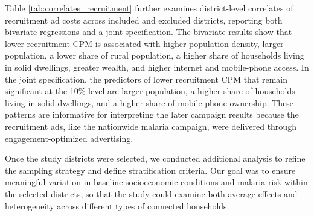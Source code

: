 Table \ref{tab:correlates_recruitment} further examines district-level correlates of recruitment ad costs across included and excluded districts, reporting both bivariate regressions and a joint specification. The bivariate results show that lower recruitment CPM is associated with higher population density, larger population, a lower share of rural population, a higher share of households living in solid dwellings, greater wealth, and higher internet and mobile-phone access. In the joint specification, the predictors of lower recruitment CPM that remain significant at the 10\% level are larger population, a higher share of households living in solid dwellings, and a higher share of mobile-phone ownership. These patterns are informative for interpreting the later campaign results because the recruitment ads, like the nationwide malaria campaign, were delivered through engagement-optimized advertising.

\begin{table}[!htbp]
    \centering
    \caption{District-level correlates of recruitment advertising costs}
    \footnotesize
    \hspace*{-1.5cm}
    
    \label{tab:correlates_recruitment}
\end{table}

Once the study districts were selected, we conducted additional analysis to refine the sampling strategy and define stratification criteria. Our goal was to ensure meaningful variation in baseline socioeconomic conditions and malaria risk within the selected districts, so that the study could examine both average effects and heterogeneity across different types of connected households.

